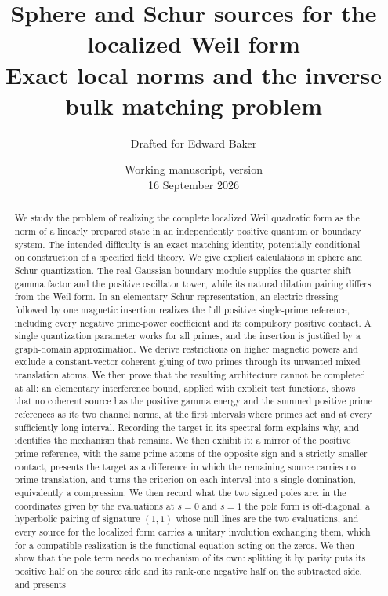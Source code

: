 \documentclass[11pt]{article}
\title{Sphere and Schur sources for the localized Weil form\\[5pt]
\large Exact local norms and the inverse bulk matching problem}
\author{Drafted for Edward Baker}
\date{Working manuscript, version \draftversion\\16 September 2026}
\numberwithin{equation}{section}
\theoremstyle{definition}
\theoremstyle{remark}
\begin{document}
\maketitle
\begin{abstract}
We study the problem of realizing the complete localized Weil quadratic
form as the norm of a linearly prepared state in an independently positive
quantum or boundary system. The intended difficulty is an exact matching
identity, potentially conditional on construction of a specified field
theory. We give explicit calculations in sphere and Schur quantization.
The real Gaussian boundary module supplies the quarter-shift gamma factor
and the positive oscillator tower, while its natural dilation pairing
differs from the Weil form. In an elementary Schur representation, an
electric dressing followed by one magnetic insertion realizes the full
positive single-prime reference, including every negative prime-power
coefficient and its compulsory positive contact. A single quantization
parameter works for all primes, and the insertion is justified by a
graph-domain approximation. We derive restrictions on higher magnetic
powers and exclude a constant-vector coherent gluing of two primes through
its unwanted mixed translation atoms. We then prove that the resulting
architecture cannot be completed at all: an elementary interference bound,
applied with explicit test functions, shows that no coherent source has the
positive gamma energy and the summed positive prime references as its two
channel norms, at the first intervals where primes act and at every
sufficiently long interval. Recording the target in its spectral form
explains why, and identifies the mechanism that remains. We then exhibit it:
a mirror of the positive prime reference, with the same prime atoms of the
opposite sign and a strictly smaller contact, presents the target as a
difference in which the remaining source carries no prime translation, and
turns the criterion on each interval into a single domination, equivalently a
compression. We then record what the two signed poles are: in the coordinates
given by the evaluations at $s=0$ and $s=1$ the pole form is off-diagonal, a
hyperbolic pairing of signature $(1,1)$ whose null lines are the two
evaluations, and every source for the localized form carries a unitary
involution exchanging them, which for a compatible realization is the
functional equation acting on the zeros. We then show that the pole term needs
no mechanism of its own: splitting it by parity puts its positive half on the
source side and its rank-one negative half on the subtracted side, and presents

\end{abstract}
\end{document}
